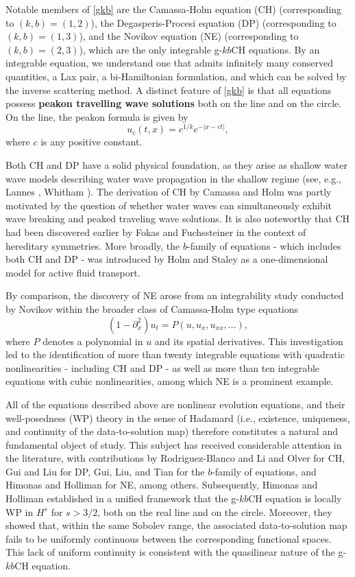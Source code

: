 \documentclass{amsart}
\newcommand{\p}{\partial}
\begin{document}
Notable members of \eqref{gkb} are the Camassa-Holm equation (CH) (corresponding to $(k,b)=(1,2)$), the Degasperis-Procesi equation (DP) (corresponding to $(k,b)=(1,3)$), and the Novikov equation (NE) (corresponding to $(k,b)=(2,3)$), which are the only integrable g-$kb$CH equations. By an integrable equation, we understand one that admits infinitely many conserved quantities, a Lax pair, a bi-Hamiltonian formulation, and which can be solved by the inverse scattering method. A distinct feature of \eqref{gkb}  is that all equations possess \textbf{peakon travelling wave solutions} both on the line and on the circle. On the line, the peakon formula is given by
\[
u_c(t,x)=c^{1/k}e^{-|x-ct|},
\]   
where $c$ is any positive constant. 

Both CH and DP have a solid physical foundation, as they arise as shallow water wave models describing water wave propagation in the shallow regime (see, e.g., Lannes \cite{L13}, Whitham \cite{W74}). The derivation of CH by Camassa and Holm \cite{CH93} was partly motivated by the question of whether water waves can simultaneously exhibit wave breaking and peaked traveling wave solutions. It is also noteworthy that CH had been discovered earlier by Fokas and Fuchssteiner \cite{FF81} in the context of hereditary symmetries. More broadly, the $b$-family of equations - which includes both CH and DP - was introduced by Holm and Staley \cite{HS03,HS032} as a one-dimensional model for active fluid transport.

By comparison, the discovery of NE arose from an integrability study conducted by Novikov \cite{N09} within the broader class of Camassa-Holm type equations
\[
(1-\p^2_x)u_t=P(u, u_x, u_{xx}, \ldots),
\]
where $P$ denotes a polynomial in $u$ and its spatial derivatives. This investigation led to the identification of more than twenty integrable equations with quadratic nonlinearities - including CH and DP - as well as more than ten integrable equations with cubic nonlinearities, among which NE is a prominent example.


All of the equations described above are nonlinear evolution equations, and their well-posedness (WP) theory in the sense of Hadamard (i.e., existence, uniqueness, and continuity of the data-to-solution map) therefore constitutes a natural and fundamental object of study. This subject has received considerable attention in the literature, with contributions by Rodriguez-Blanco \cite{R01} and Li and Olver \cite{LO00} for CH, Gui and Liu \cite{GL11} for DP, Gui, Liu, and Tian \cite{GLT08} for the $b$-family of equations, and Himonas and Holliman \cite{HH12} for NE, among others. Subsequently, Himonas and Holliman \cite{HH14} established in a unified framework that the g-$kb$CH equation is locally WP in $H^s$ for $s>3/2$, both on the real line and on the circle. Moreover, they showed that, within the same Sobolev range, the associated data-to-solution map fails to be uniformly continuous between the corresponding functional spaces. This lack of uniform continuity is consistent with the quasilinear nature of the g-$kb$CH equation.
\end{document}
